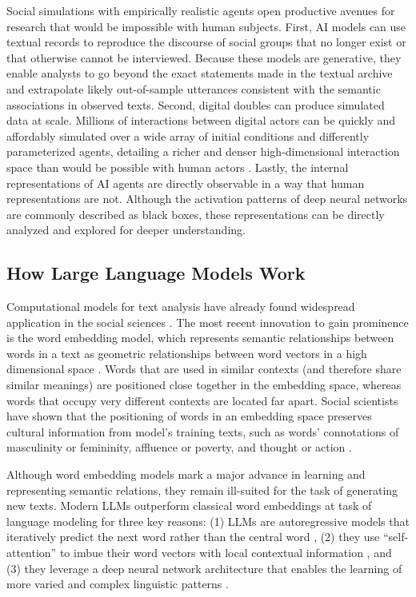 \documentclass{article} %
\begin{document}
Social simulations with empirically realistic agents open productive
avenues for research that would be impossible with human subjects.
First, AI models can use textual records to reproduce the discourse of
social groups that no longer exist or that otherwise cannot be
interviewed. Because these models are generative, they enable analysts
to go beyond the exact statements made in the textual archive and
extrapolate likely out-of-sample utterances consistent with the semantic
associations in observed texts. Second, digital doubles can produce
simulated data at scale. Millions of interactions between digital actors
can be quickly and affordably simulated over a wide array of initial
conditions and differently parameterized agents, detailing a richer and
denser high-dimensional interaction space than would be possible with
human actors \parencite{Lai2024-qg}. Lastly, the internal representations of AI agents are directly
observable in a way that human representations are not. Although the
activation patterns of deep neural networks are commonly described as
black boxes, these representations can be directly analyzed and explored
for deeper understanding.

\subsection*{How Large Language Models Work}

Computational models for text analysis have already found widespread
application in the social sciences
\parencite{Gentzkow2019-vu, Grimmer2022-fu}. The most recent innovation to gain
prominence is the word embedding model, which represents semantic
relationships between words in a text as geometric relationships between
word vectors in a high dimensional space
\parencite{Mikolov2013-va,
Pennington2014-dz}. Words that are used in similar
contexts (and therefore share similar meanings) are positioned close
together in the embedding space, whereas words that occupy very
different contexts are located far apart. Social scientists have shown
that the positioning of words in an embedding space preserves cultural
information from model's training texts, such as words' connotations of
masculinity or femininity, affluence or poverty, and thought or action
\parencite{Boutyline2023-sr, Garg2018-jf, Kozlowski2019-vh, Stoltz2019-mx}.

Although word embedding models mark a major advance in learning and
representing semantic relations, they remain ill-suited for the task of
generating new texts. Modern LLMs outperform classical word embeddings
at task of language modeling for three key reasons: (1) LLMs are
autoregressive models that iteratively predict the next word rather than
the central word \parencite{Brown2020-nh}, (2) they use ``self-attention'' to imbue their word vectors
with local contextual information \parencite{Vaswani2017-wi}, and
(3) they leverage a deep neural network architecture that enables the
learning of more varied and complex linguistic patterns \parencite{Kaplan2020-lo}.
\end{document}
